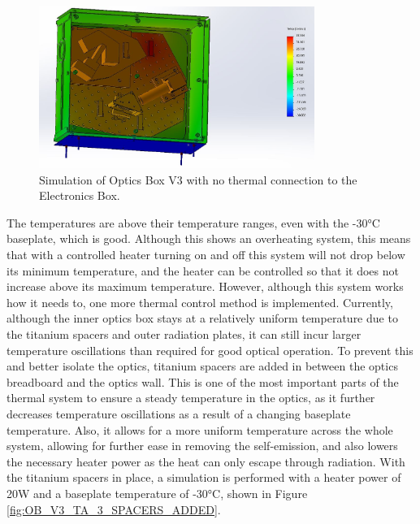 \begin{figure}
    \centering
    \includegraphics[width=0.8\textwidth]{chap3_images/LIFE_V3_images/TA_-30_deg_35W_heater.JPG}
    \caption{Simulation of Optics Box V3 with no thermal connection to the Electronics Box.}
    \label{fig:OB_V3_TA_2}
\end{figure}

The temperatures are above their temperature ranges, even with the -30°C baseplate, which is good. Although this shows an overheating system, this means that with a controlled heater turning on and off this system will not drop below its minimum temperature, and the heater can be controlled so that it does not increase above its maximum temperature. However, although this system works how it needs to, one more thermal control method is implemented. Currently, although the inner optics box stays at a relatively uniform temperature due to the titanium spacers and outer radiation plates, it can still incur larger temperature oscillations than required for good optical operation. To prevent this and better isolate the optics, titanium spacers are added in between the optics breadboard and the optics wall. This is one of the most important parts of the thermal system to ensure a steady temperature in the optics, as it further decreases temperature oscillations as a result of a changing baseplate temperature. Also, it allows for a more uniform temperature across the whole system, allowing for further ease in removing the self-emission, and also lowers the necessary heater power as the heat can only escape through radiation. With the titanium spacers in place, a simulation is performed with a heater power of 20W and a baseplate temperature of -30°C, shown in Figure \ref{fig:OB_V3_TA_3_SPACERS_ADDED}.

